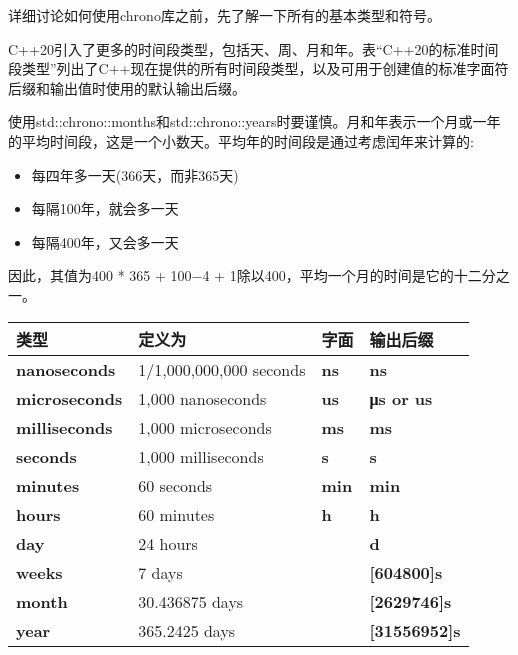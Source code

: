 
详细讨论如何使用chrono库之前，先了解一下所有的基本类型和符号。


C++20引入了更多的时间段类型，包括天、周、月和年。表“C++20的标准时间段类型”列出了C++现在提供的所有时间段类型，以及可用于创建值的标准字面符后缀和输出值时使用的默认输出后缀。

使用std::chrono::months和std::chrono::years时要谨慎。月和年表示一个月或一年的平均时间段，这是一个小数天。平均年的时间段是通过考虑闰年来计算的:

\begin{itemize}
\item
每四年多一天(366天，而非365天)

\item
每隔100年，就会多一天

\item
每隔400年，又会多一天
\end{itemize}

因此，其值为400 * 365 + 100−4 + 1除以400，平均一个月的时间是它的十二分之一。

\begin{longtable}[c]{|l|l|l|l|}
\hline
\textbf{类型}         & \textbf{定义为}     & \textbf{字面} & \textbf{输出后缀}   \\ \hline
\endfirsthead
%
\endhead
%
\textbf{nanoseconds}  & 1/1,000,000,000 seconds & \textbf{ns}      & \textbf{ns}              \\ \hline
\textbf{microseconds} & 1,000 nanoseconds       & \textbf{us}      & \textbf{μs or us}        \\ \hline
\textbf{milliseconds} & 1,000 microseconds      & \textbf{ms}      & \textbf{ms}              \\ \hline
\textbf{seconds}      & 1,000 milliseconds      & \textbf{s}       & \textbf{s}               \\ \hline
\textbf{minutes}      & 60 seconds              & \textbf{min}     & \textbf{min}             \\ \hline
\textbf{hours}        & 60 minutes              & \textbf{h}       & \textbf{h}               \\ \hline
\textbf{day}          & 24 hours                & \textbf{}        & \textbf{d}               \\ \hline
\textbf{weeks}        & 7 days                  & \textbf{}        & \textbf{{[}604800{]}s}   \\ \hline
\textbf{month}        & 30.436875 days          & \textbf{}        & \textbf{{[}2629746{]}s}  \\ \hline
\textbf{year}         & 365.2425 days           & \textbf{}        & \textbf{{[}31556952{]}s} \\ \hline
\end{longtable}


